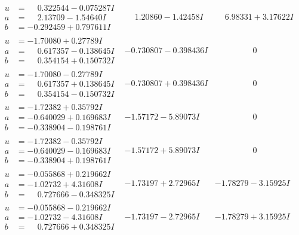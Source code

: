 \documentclass[1p]{elsarticle_modified}
\theoremstyle{definition}
\begin{document}
$$\begin{array}{c|c|c}
\begin{aligned}
u &= \phantom{-}0.322544 - 0.075287 I \\
a &= \phantom{-}2.13709 - 1.54640 I \\
b &= -0.292459 + 0.797611 I\end{aligned}
 & \phantom{-}1.20860 - 1.42458 I & \phantom{-}6.98331 + 3.17622 I \\ \hline\begin{aligned}
u &= -1.70080 + 0.27789 I \\
a &= \phantom{-}0.617357 - 0.138645 I \\
b &= \phantom{-}0.354154 + 0.150732 I\end{aligned}
 & -0.730807 - 0.398436 I & \phantom{-0.000000 } 0 \\ \hline\begin{aligned}
u &= -1.70080 - 0.27789 I \\
a &= \phantom{-}0.617357 + 0.138645 I \\
b &= \phantom{-}0.354154 - 0.150732 I\end{aligned}
 & -0.730807 + 0.398436 I & \phantom{-0.000000 } 0 \\ \hline\begin{aligned}
u &= -1.72382 + 0.35792 I \\
a &= -0.640029 + 0.169683 I \\
b &= -0.338904 - 0.198761 I\end{aligned}
 & -1.57172 - 5.89073 I & \phantom{-0.000000 } 0 \\ \hline\begin{aligned}
u &= -1.72382 - 0.35792 I \\
a &= -0.640029 - 0.169683 I \\
b &= -0.338904 + 0.198761 I\end{aligned}
 & -1.57172 + 5.89073 I & \phantom{-0.000000 } 0 \\ \hline\begin{aligned}
u &= -0.055868 + 0.219662 I \\
a &= -1.02732 + 4.31608 I \\
b &= \phantom{-}0.727666 - 0.348325 I\end{aligned}
 & -1.73197 + 2.72965 I & -1.78279 - 3.15925 I \\ \hline\begin{aligned}
u &= -0.055868 - 0.219662 I \\
a &= -1.02732 - 4.31608 I \\
b &= \phantom{-}0.727666 + 0.348325 I\end{aligned}
 & -1.73197 - 2.72965 I & -1.78279 + 3.15925 I \\ \hline\begin{aligned}

\end{aligned}
\end{array}$$
\end{document}
